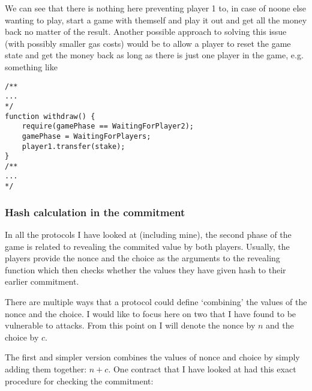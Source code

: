 \documentclass{article}
\begin{document}
    \noindent We can see that there is nothing here
    preventing player 1 to, in case of noone else wanting to
    play, start a game with themself and play it out and get
    all the money back no matter of the result. Another
    possible approach to solving this issue (with possibly
    smaller gas costs) would be to allow a player to reset
    the game state and get the money back as long as there
    is just one player in the game, e.g. something like

    \begin{lstlisting}[language=Solidity]
/**
...
*/
function withdraw() {
    require(gamePhase == WaitingForPlayer2);
    gamePhase = WaitingForPlayers;
    player1.transfer(stake);
}
/**
...
*/
    \end{lstlisting}

    \subsubsection{Hash calculation in the commitment}
    In all the protocols I have looked at (including mine),
    the second phase of the game is related to revealing the
    commited value by both players. Usually, the players
    provide the nonce and the choice as the arguments to the
    revealing function which then checks whether the values
    they have given hash to their earlier commitment.
    \newline

    \noindent There are multiple ways that a protocol could
    define `combining' the values of the nonce and the
    choice. I would like to focus here on two that I have
    found to be vulnerable to attacks. From this point on I
    will denote the nonce by \(n\) and the choice by \(c\).
    \newline

    \noindent The first and simpler version combines the
    values of nonce and choice by simply adding them
    together: \(n + c\). One contract that I have looked at
    had this exact procedure for checking the commitment:
\end{document}

